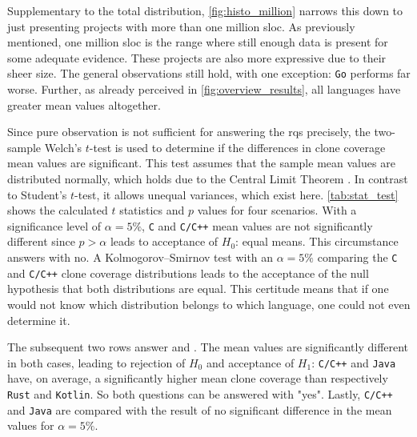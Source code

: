 Supplementary to the total distribution, \autoref{fig:histo_million} narrows this down to just presenting projects with more than one million \acl{sloc}. As previously mentioned, one million \ac{sloc} is the range where still enough data is present for some adequate evidence. These projects are also more expressive due to their sheer size. The general observations still hold, with one exception: \texttt{Go} performs far worse. Further, as already perceived in \autoref{fig:overview_results}, all languages have greater mean values altogether.

Since pure observation is not sufficient for answering the \aclp{rq} precisely, the two-sample Welch's $t$-test is used to determine if the differences in clone coverage mean values are significant. This test assumes that the sample mean values are distributed normally, which holds due to the Central Limit Theorem \cite{shafer2022introductory}. In contrast to Student's $t$-test, it allows unequal variances, which exist here. \autoref{tab:stat_test} shows the calculated $t$ statistics and $p$ values for four scenarios. With a significance level of $\alpha = 5\%$, \texttt{C} and \texttt{C/C++} mean values are not significantly different since $p > \alpha$ leads to acceptance of $H_0$: equal means. This circumstance answers  with no.
A Kolmogorov–Smirnov test with an $\alpha=5\%$ comparing the \texttt{C} and \texttt{C/C++} clone coverage distributions leads to the acceptance of the null hypothesis that both distributions are equal. This certitude means that if one would not know which distribution belongs to which language, one could not even determine it.

The subsequent two rows answer  and . The mean values are significantly different in both cases, leading to rejection of $H_0$ and acceptance of $H_1$: \texttt{C/C++} and \texttt{Java} have, on average, a significantly higher mean clone coverage than respectively \texttt{Rust} and \texttt{Kotlin}. So both questions can be answered with "yes".
Lastly, \texttt{C/C++} and \texttt{Java} are compared with the result of no significant difference in the mean values for $\alpha = 5\%$.

